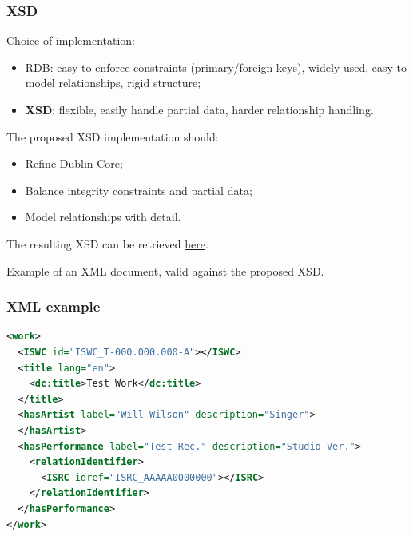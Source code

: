 \documentclass{beamer}
\newcommand\rb[1]{\textcolor{ThemeRed}{\textbf{#1}}}
\begin{document}
  \begin{frame}
    \frametitle{XSD}

    Choice of implementation:

    \vspace{0.5em}

    \begin{itemize}
      \item RDB: easy to enforce constraints (primary/foreign keys), widely used, easy to model relationships, rigid structure;
      \item \rb{XSD}: flexible, easily handle partial data, harder relationship handling.
    \end{itemize}

    \vspace{1.5em}

    The proposed XSD implementation should:

    \vspace{0.5em}

    \begin{itemize}
      \item Refine Dublin Core;
      \item Balance integrity constraints and partial data;
      \item Model relationships with detail. 
    \end{itemize}

    \vspace{1.5em}

    The resulting XSD can be retrieved \href{https://github.com/pindri/ODMC_exam/blob/master/odmc.xsd}{here}.
  \end{frame}




  \begin{frame}[fragile]

    Example of an XML document, valid against the proposed XSD.

    \vspace{1em}

    \frametitle{XML example}
\lstset{basicstyle=\scriptsize}
\begin{lstlisting}[language=XML]
<work>
  <ISWC id="ISWC_T-000.000.000-A"></ISWC>
  <title lang="en">
    <dc:title>Test Work</dc:title>
  </title>
  <hasArtist label="Will Wilson" description="Singer">
  </hasArtist>
  <hasPerformance label="Test Rec." description="Studio Ver.">
    <relationIdentifier>
      <ISRC idref="ISRC_AAAAA0000000"></ISRC>
    </relationIdentifier>
  </hasPerformance>
</work>
\end{lstlisting}
  \end{frame}
\end{document}
